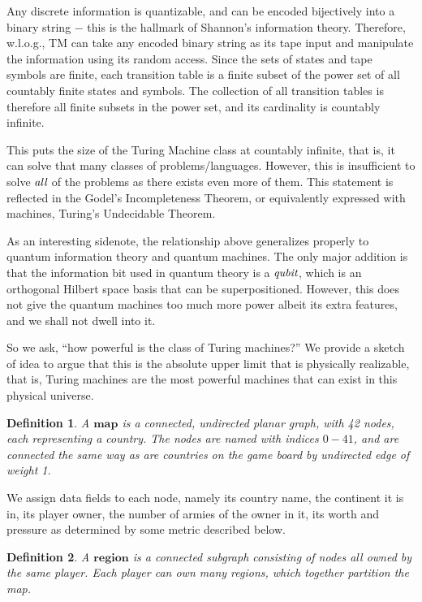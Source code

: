 \documentclass[12pt]{article}  %
\newtheorem{definition}{Definition}
\begin{document}
Any discrete information is quantizable, and can be encoded bijectively into a binary string $-$ this is the hallmark of Shannon's information theory. Therefore, w.l.o.g., TM can take any encoded binary string as its tape input and manipulate the information using its random access. Since the sets of states and tape symbols are finite, each transition table is a finite subset of the power set of all countably finite states and symbols. The collection of all transition tables is therefore all finite subsets in the power set, and its cardinality is countably infinite.

This puts the size of the Turing Machine class at countably infinite, that is, it can solve that many classes of problems/languages. However, this is insufficient to solve $\emph{all}$ of the problems as there exists even more of them. This statement is reflected in the Godel's Incompleteness Theorem, or equivalently expressed with machines, Turing's Undecidable Theorem.

As an interesting sidenote, the relationship above generalizes properly to quantum information theory and quantum machines. The only major addition is that the information bit used in quantum theory is a $\emph{qubit}$, which is an orthogonal Hilbert space basis that can be superpositioned. However, this does not give the quantum machines too much more power albeit its extra features, and we shall not dwell into it.

So we ask, ``how powerful is the class of Turing machines?'' We provide a sketch of idea to argue that this is the absolute upper limit that is physically realizable, that is, Turing machines are the most powerful machines that can exist in this physical universe.


\begin{definition} \label{map}
A $\textbf{map}$ is a connected, undirected planar graph, with 42 nodes, each representing a country. The nodes are named with indices $0-41$, and are connected the same way as are countries on the game board by undirected edge of weight 1.
\end{definition}

We assign data fields to each node, namely its country name, the continent it is in, its player owner, the number of armies of the owner in it, its worth and pressure as determined by some metric described below.


\begin{definition} \label{region}
A $\textbf{region}$ is a connected subgraph consisting of nodes all owned by the same player. Each player can own many regions, which together partition the map.
\end{definition}
\end{document}
